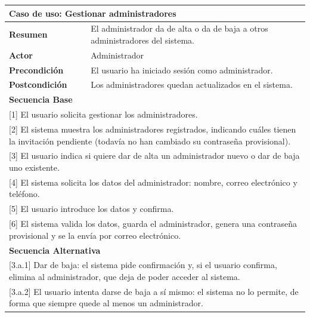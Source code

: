 \begin{table}[h!]
    \centering
    \renewcommand{\arraystretch}{1.5}

    \begin{tabular}{|p{4cm}|p{11cm}|}
        \hline
        \multicolumn{2}{|l|}{\textbf{Caso de uso: Gestionar administradores}} \\
        \hline
        \textbf{Resumen} & El administrador da de alta o da de baja a otros administradores del sistema. \\
        \hline
        \textbf{Actor} & Administrador \\
        \hline
        \textbf{Precondición} & El usuario ha iniciado sesión como administrador. \\
        \hline
        \textbf{Postcondición} & Los administradores quedan actualizados en el sistema. \\
        \hline
        \multicolumn{2}{|l|}{\textbf{Secuencia Base}} \\
        \hline
        \multicolumn{2}{|p{15cm}|}{ [1] El usuario solicita gestionar los administradores. } \\
        \hline
        \multicolumn{2}{|p{15cm}|}{ [2] El sistema muestra los administradores registrados, indicando cuáles tienen la invitación pendiente (todavía no han cambiado su contraseña provisional). } \\
        \hline
        \multicolumn{2}{|p{15cm}|}{ [3] El usuario indica si quiere dar de alta un administrador nuevo o dar de baja uno existente. } \\
        \hline
        \multicolumn{2}{|p{15cm}|}{ [4] El sistema solicita los datos del administrador: nombre, correo electrónico y teléfono. } \\
        \hline
        \multicolumn{2}{|p{15cm}|}{ [5] El usuario introduce los datos y confirma. } \\
        \hline
        \multicolumn{2}{|p{15cm}|}{ [6] El sistema valida los datos, guarda el administrador, genera una contraseña provisional y se la envía por correo electrónico. } \\
        \hline
        \multicolumn{2}{|l|}{\textbf{Secuencia Alternativa}} \\
        \hline
        \multicolumn{2}{|p{15cm}|}{ [3.a.1] Dar de baja: el sistema pide confirmación y, si el usuario confirma, elimina al administrador, que deja de poder acceder al sistema. } \\
        \hline
        \multicolumn{2}{|p{15cm}|}{ [3.a.2] El usuario intenta darse de baja a sí mismo: el sistema no lo permite, de forma que siempre quede al menos un administrador. } \\

\end{tabular}
\end{table}
